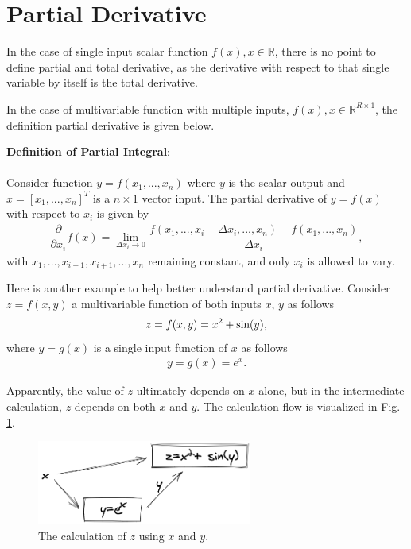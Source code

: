 \section{Partial Derivative} \label{ch6sec:partialtotalderivative}

In the case of single input scalar function $f(x), x \in \mathbb{R}$, there is no point to define partial and total derivative, as the derivative with respect to that single variable by itself is the total derivative.

In the case of multivariable function with multiple inputs, $f(x), x \in \mathbb{R}^{R\times 1}$, the definition partial derivative is given below.

\begin{VF}
	\textbf{Definition of Partial Integral}:
	\\
	\\
	Consider function $y = f(x_1,...,x_n)$ where $y$ is the scalar output and $x = \left[x_1, ..., x_n\right]^T$ is a $n\times 1$ vector input. The partial derivative of $y=f(x)$ with respect to $x_i$ is given by
	\begin{eqnarray}
		\dfrac{\partial}{\partial x_i}f(x) = \lim_{\Delta x_i \rightarrow 0} \dfrac{f(x_1,..., x_i + \Delta x_i,...,x_n)-f(x_1,...,x_n)}{\Delta x_i}, \label{ch6eq:formalpartialderivative}
	\end{eqnarray}
	with $x_1,...,x_{i-1}, x_{i+1},..., x_n$ remaining constant, and only $x_i$ is allowed to vary.
	
\end{VF}

Here is another example to help better understand partial derivative. Consider $z=f(x, y)$ a multivariable function of both inputs $x$, $y$ as follows
\begin{eqnarray}
	z = f(x,y) = x^2 + \textup{sin}(y), \label{ch6eq:partialdiffchainexp1}
\end{eqnarray}
where $y = g(x)$ is a single input function of $x$ as follows
\begin{eqnarray}
	y = g(x) = e^x. \label{ch6eq:partialdiffchainexp2}
\end{eqnarray}

Apparently, the value of $z$ ultimately depends on $x$ alone, but in the intermediate calculation, $z$ depends on both $x$ and $y$. The calculation flow is visualized in Fig. \ref{ch6fig_chainexp}.

\begin{figure}
	\centering
	\includegraphics[width=200pt]{chapters/part-2/figures/chainexp.png}
	\caption{The calculation of $z$ using $x$ and $y$.} \label{ch6fig_chainexp}
\end{figure}

